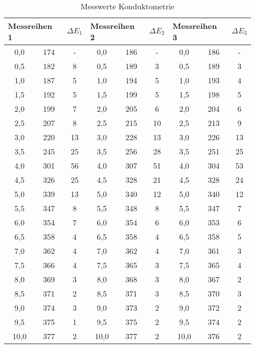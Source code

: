 \begin{table}[]
	\centering
	\caption{Messwerte Konduktometrie}
	\begin{tabular}{ccc|ccc|ccc}
		\hline
	\multicolumn{2}{l}{\textbf{Messreihen 1}} &       \multicolumn{1}{l}{$\Delta E_1$} & \multicolumn{2}{l}{\textbf{Messreihen 2}} &        \multicolumn{1}{l}{$\Delta E_2$} & \multicolumn{2}{l}{\textbf{Messreihen 3}} & \multicolumn{1}{l}{$\Delta E_3$} \\
	\hline
	0,0   & 174   & - & 0,0   & 186   & - & 0,0   & 186   & -\\
	0,5   & 182   & 8     & 0,5   & 189   & 3     & 0,5   & 189   & 3 \\
	1,0   & 187   & 5     & 1,0   & 194   & 5     & 1,0   & 193   & 4 \\
	1,5   & 192   & 5     & 1,5   & 199   & 5     & 1,5   & 198   & 5 \\
	2,0   & 199   & 7     & 2,0   & 205   & 6     & 2,0   & 204   & 6 \\
	2,5   & 207   & 8     & 2,5   & 215   & 10    & 2,5   & 213   & 9 \\
	3,0   & 220   & 13    & 3,0   & 228   & 13    & 3,0   & 226   & 13 \\
	3,5   & 245   & 25    & 3,5   & 256   & 28    & 3,5   & 251   & 25 \\
	4,0   & 301   & 56    & 4,0   & 307   & 51    & 4,0   & 304   & 53 \\
	4,5   & 326   & 25    & 4,5   & 328   & 21    & 4,5   & 328   & 24 \\
	5,0   & 339   & 13    & 5,0   & 340   & 12    & 5,0   & 340   & 12 \\
	5,5   & 347   & 8     & 5,5   & 348   & 8     & 5,5   & 347   & 7 \\
	6,0   & 354   & 7     & 6,0   & 354   & 6     & 6,0   & 353   & 6 \\
	6,5   & 358   & 4     & 6,5   & 358   & 4     & 6,5   & 358   & 5 \\
	7,0   & 362   & 4     & 7,0   & 362   & 4     & 7,0   & 361   & 3 \\
	7,5   & 366   & 4     & 7,5   & 365   & 3     & 7,5   & 365   & 4 \\
	8,0   & 369   & 3     & 8,0   & 368   & 3     & 8,0   & 367   & 2 \\
	8,5   & 371   & 2     & 8,5   & 371   & 3     & 8,5   & 370   & 3 \\
	9,0   & 374   & 3     & 9,0   & 373   & 2     & 9,0   & 372   & 2 \\
	9,5   & 375   & 1     & 9,5   & 375   & 2     & 9,5   & 374   & 2 \\
	10,0  & 377   & 2     & 10,0  & 377   & 2     & 10,0  & 376   & 2 \\
\end{tabular}%
\label{tab:potentio_mess}
\end{table}




